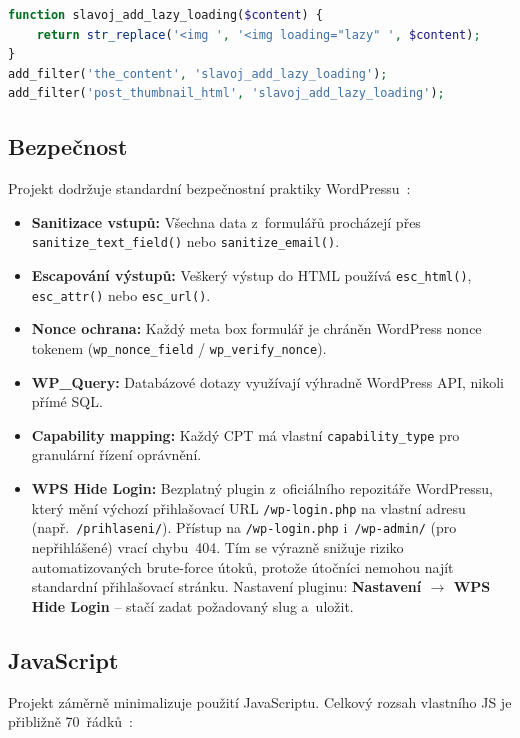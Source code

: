 \documentclass[12pt,a4paper]{article}
\begin{document}
\begin{lstlisting}[language=PHP]
function slavoj_add_lazy_loading($content) {
    return str_replace('<img ', '<img loading="lazy" ', $content);
}
add_filter('the_content', 'slavoj_add_lazy_loading');
add_filter('post_thumbnail_html', 'slavoj_add_lazy_loading');
\end{lstlisting}

\subsection{Bezpečnost}

Projekt dodržuje standardní bezpečnostní praktiky WordPressu~\cite{wpdev,themehandbook}:

\begin{itemize}
    \item \textbf{Sanitizace vstupů:} Všechna data z~formulářů procházejí přes \texttt{sanitize\_text\_field()} nebo \texttt{sanitize\_email()}.
    \item \textbf{Escapování výstupů:} Veškerý výstup do HTML používá \texttt{esc\_html()}, \texttt{esc\_attr()} nebo \texttt{esc\_url()}.
    \item \textbf{Nonce ochrana:} Každý meta box formulář je chráněn WordPress nonce tokenem (\texttt{wp\_nonce\_field} / \texttt{wp\_verify\_nonce}).
    \item \textbf{WP\_Query:} Databázové dotazy využívají výhradně WordPress API, nikoli přímé SQL.
    \item \textbf{Capability mapping:} Každý CPT má vlastní \texttt{capability\_type} pro granulární řízení oprávnění.
    \item \textbf{WPS Hide Login:} Bezplatný plugin z~oficiálního repozitáře WordPressu, který mění výchozí přihlašovací URL \texttt{/wp-login.php} na vlastní adresu (např.\ \texttt{/prihlaseni/}). Přístup na \texttt{/wp-login.php} i~\texttt{/wp-admin/} (pro nepřihlášené) vrací chybu~404. Tím se výrazně snižuje riziko automatizovaných brute-force útoků, protože útočníci nemohou najít standardní přihlašovací stránku. Nastavení pluginu: \textbf{Nastavení $\rightarrow$ WPS Hide Login} -- stačí zadat požadovaný slug a~uložit.
\end{itemize}

\subsection{JavaScript}

Projekt záměrně minimalizuje použití JavaScriptu. Celkový rozsah vlastního JS je přibližně 70~řádků~\cite{jsreport}:
\end{document}
